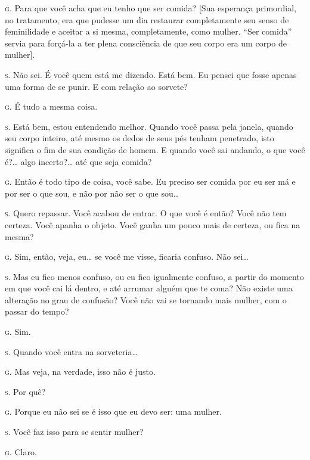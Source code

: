 \noindent\hskip0mm\textsc{g.} Para que você acha que eu tenho que ser comida? [Sua esperança
primordial, no tratamento, era que pudesse um dia restaurar
completamente seu senso de feminilidade e aceitar a si mesma,
completamente, como mulher. ``Ser comida''
servia para forçá-la a ter plena consciência de que seu corpo era um
corpo de mulher].

\noindent\hskip0mm\textsc{s.} Não sei. É você quem está me dizendo. Está bem. Eu pensei que fosse
apenas uma forma de se punir.\idxmasoqpun{} E com relação ao sorvete?

\noindent\hskip0mm\textsc{g.} É tudo a mesma coisa.

\noindent\hskip0mm\textsc{s.} Está bem, estou entendendo melhor. Quando você passa pela janela,
quando seu corpo inteiro, até mesmo os dedos de seus pés tenham
penetrado, isto significa o fim de sua condição de homem. E quando você
sai andando, o que você é?\ldots{} algo incerto?\ldots{} até que seja comida?

\noindent\hskip0mm\textsc{g.} Então é todo tipo de coisa, você sabe. Eu preciso ser comida por eu
ser má e por ser o que sou, e não por não ser o que sou\ldots{}

\noindent\hskip0mm\textsc{s.} Quero repassar. Você acabou de entrar. O que você é então? Você não
tem certeza. Você apanha o objeto. Você ganha um pouco mais de certeza,
ou fica na mesma?

\noindent\hskip0mm\textsc{g.} Sim, então, veja, eu\ldots{} se você me visse, ficaria confuso. Não sei\ldots{}

\noindent\hskip0mm\textsc{s.} Mas eu fico menos confuso, ou eu fico igualmente confuso, a partir do
momento em que você cai lá dentro, e até arrumar alguém que te coma?
Não existe uma alteração no grau de confusão? Você não vai se tornando
mais mulher, com o passar do tempo?

\noindent\hskip0mm\textsc{g.} Sim.

\noindent\hskip0mm\textsc{s.} Quando você entra na sorveteria\ldots{}

\noindent\hskip0mm\textsc{g.} Mas veja, na verdade, isso não é justo.

\noindent\hskip0mm\textsc{s.} Por quê?

\noindent\hskip0mm\textsc{g.} Porque eu não sei se é isso que eu devo ser: uma mulher.

\noindent\hskip0mm\textsc{s.} Você faz isso para se sentir mulher?

\noindent\hskip0mm\textsc{g.} Claro.

